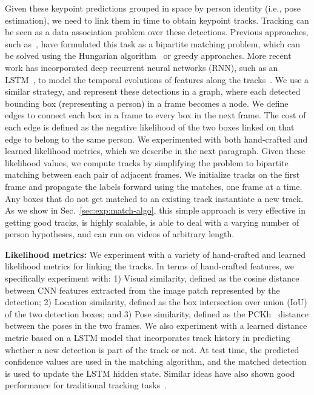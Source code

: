 \documentclass[10pt,twocolumn,letterpaper]{article}
\begin{document}
Given these keypoint predictions grouped in space by person identity (i.e., pose estimation), we need to link them in time 
to obtain keypoint tracks.
Tracking can be seen as a data association problem over these detections. Previous approaches, such as~\cite{pirsiavash2011globally}, have formulated this task as a bipartite matching problem, which can be solved using the Hungarian algorithm~\cite{kuhn1955hungarian} or greedy approaches. More recent work has incorporated
deep recurrent neural networks (RNN), such as an LSTM~\cite{hochreiter1997lstm},
to model the temporal evolutions of features along the
tracks~\cite{milan2017online,sadeghian2017tracking}.
We use a similar strategy, and
represent these detections in a graph, where each detected bounding box (representing a person) in a frame becomes a node.
We define edges to connect each box in a frame to every box in the next frame.
The cost of each edge is defined as the negative likelihood of the two boxes linked on that edge to belong to the same person.
We experimented with both hand-crafted and learned likelihood metrics, which we describe in the next paragraph.
Given these likelihood values, we compute tracks by simplifying the problem to bipartite matching between each pair of adjacent frames.
We initialize tracks on the first frame and propagate the labels forward using the matches,
one frame at a time. Any boxes that do not get matched to an existing track
instantiate a new track. As we show in Sec.~\ref{sec:exp:match-algo}, this simple
approach is very effective in getting good tracks, is highly scalable, is able to deal with a varying number of person hypotheses, and can run on videos of arbitrary length.





{\noindent \bf Likelihood metrics:}
We experiment with a variety of hand-crafted and learned likelihood metrics for linking the tracks.
In terms of hand-crafted features, we specifically experiment with: 1) Visual similarity, defined as
the cosine distance between CNN features
extracted from the image patch represented by the detection; 2) Location similarity, defined
as the box intersection over union (IoU) of the two detection boxes; and 3) Pose similarity,
defined as the PCKh~\cite{yang2013articulated} distance between the poses in the two frames.
We also experiment with a learned distance metric based on a LSTM model that incorporates track history in predicting
whether a new detection is part of the track or not. At test time, the predicted confidence values are used in the matching algorithm, and the matched detection is used to update the LSTM hidden state.
Similar ideas have also shown good performance for traditional tracking tasks~\cite{sadeghian2017tracking}.
\end{document}
